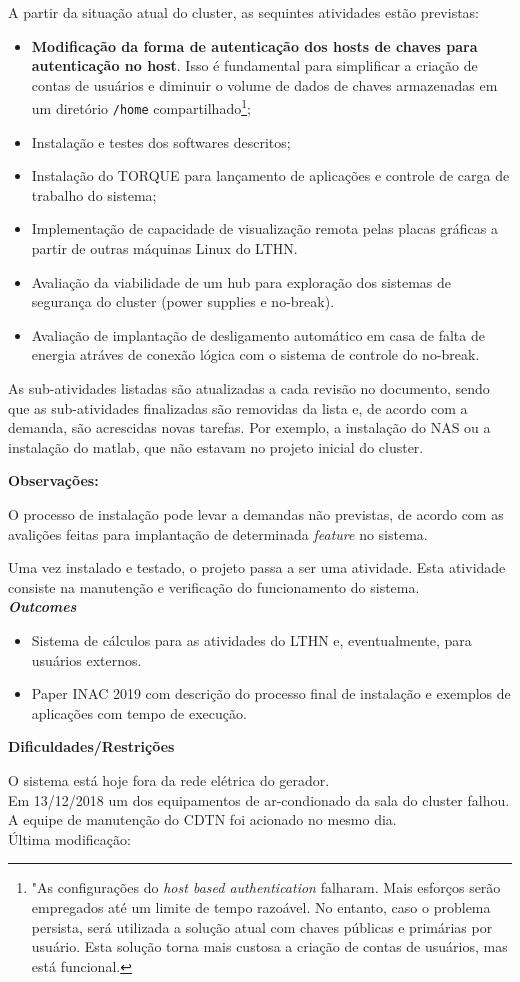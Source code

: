 A partir da situação atual do cluster, as sequintes atividades estão previstas:
\begin{itemize}
	\item[1] \textbf{Modificação da forma de autenticação dos hosts de chaves 
	para autenticação no host}. Isso é fundamental para simplificar a criação 
	de contas de usuários e diminuir o volume de dados de chaves armazenadas em 
	um diretório \texttt{/home} compartilhado\footnote{"As configurações do \textit{host based authentication} falharam. Mais esforços serão empregados até um limite de tempo razoável. No entanto, caso o problema persista, será utilizada a solução atual com chaves públicas e primárias por usuário. Esta solução torna mais custosa a criação de contas de usuários, mas está funcional.};
	\item[2] Instalação e testes dos softwares descritos;
	\item[3] Instalação do TORQUE para lançamento de aplicações e controle de 
	carga de trabalho do sistema;
	\item[4] Implementação de capacidade de visualização remota pelas placas gráficas a partir de outras máquinas Linux do LTHN.
	\item[5] Avaliação da viabilidade de um hub para exploração dos sistemas de segurança do cluster (power supplies e no-break).
	\item[6] Avaliação de implantação de desligamento automático em casa de falta de energia atráves de conexão lógica com o sistema de controle do no-break.
\end{itemize}

As sub-atividades listadas são atualizadas a cada revisão no documento, sendo que 
as sub-atividades finalizadas são removidas da lista e, de acordo com a demanda, 
são acrescidas novas tarefas. Por exemplo, a instalação do NAS ou a instalação do 
matlab, que não estavam no projeto inicial do cluster.

\textbf{Observações:}

O processo de instalação pode levar a demandas não previstas, de acordo com as avalições feitas para implantação de determinada \textit{feature} no sistema.

Uma vez instalado e testado, o projeto passa a ser uma atividade. Esta atividade 
consiste na manutenção e verificação do funcionamento do sistema.\\

\textbf{\textit{Outcomes}}

\begin{itemize}
	\item[1] Sistema de cálculos para as atividades do LTHN e, eventualmente, para usuários externos.
	\item[2] Paper INAC 2019 com descrição do processo final de instalação e exemplos de aplicações com tempo de execução.

\end{itemize}


\textbf{Dificuldades/Restrições}

O sistema está hoje fora da rede elétrica do gerador.\\
Em 13/12/2018 um dos equipamentos de ar-condionado da sala do cluster falhou. A equipe de manutenção do CDTN foi acionado no mesmo dia.\\


Última modificação: \date{\today}

